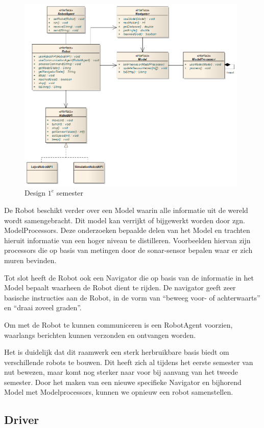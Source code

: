 \documentclass[12pt,a4paper]{report}
\begin{document}
\begin{figure}[htbp]
  \centering
  \includegraphics[width=110mm]{resources/design-semester1.png}
  \caption{Design $1^e$ semester}
  \label{uml:design-semester1}
\end{figure}

De Robot beschikt verder over een Model waarin alle informatie uit de wereld wordt samengebracht. Dit model kan verrijkt of bijgewerkt worden door zgn. ModelProcessors. Deze onderzoeken bepaalde delen van het Model en trachten hieruit informatie van een hoger niveau te distilleren. Voorbeelden hiervan zijn processors die op basis van metingen door de sonar-sensor bepalen waar er zich muren bevinden.

Tot slot heeft de Robot ook een Navigator die op basis van de informatie in het Model bepaalt waarheen de Robot dient te rijden. De navigator geeft zeer basische instructies aan de Robot, in de vorm van ``beweeg voor- of achterwaarts'' en ``draai zoveel graden''.

Om met de Robot te kunnen communiceren is een RobotAgent voorzien, waarlangs berichten kunnen verzonden en ontvangen worden.

Het is duidelijk dat dit raamwerk een sterk herbruikbare basis biedt om verschillende robots te bouwen. Dit heeft zich al tijdens het eerste semester van nut bewezen, maar komt nog sterker naar voor bij aanvang van het tweede semester. Door het maken van een nieuwe specifieke Navigator en bijhorend Model met Modelprocessors, kunnen we opnieuw een robot samenstellen.

\subsection{Driver}
\end{document}
